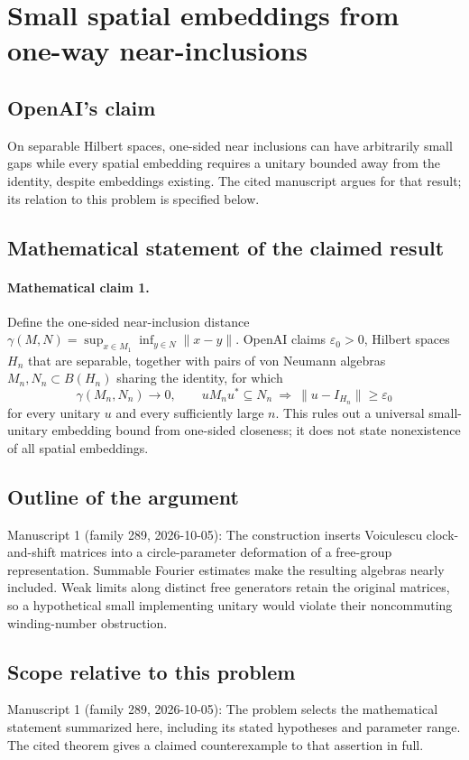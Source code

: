 \documentclass[11pt]{article}
\begin{document}
\section*{Small spatial embeddings from one-way near-inclusions}

\subsection{OpenAI's claim}
On separable Hilbert spaces, one-sided near inclusions can have arbitrarily small gaps while every spatial embedding requires a unitary bounded away from the identity, despite embeddings existing. The cited manuscript argues for that result; its relation to this problem is specified below.

\subsection{Mathematical statement of the claimed result}
\paragraph{Mathematical claim 1.} Define the one-sided near-inclusion distance $\gamma(M,N)=\sup_{x\in M_1}\inf_{y\in N}\|x-y\|$. OpenAI claims $\varepsilon_0>0$, Hilbert spaces $H_n$ that are separable, together with pairs of von Neumann algebras $M_n,N_n\subset B(H_n)$ sharing the identity, for which
\[
\gamma(M_n,N_n)\to0,
\qquad uM_nu^*\subseteq N_n\ \Longrightarrow\ \|u-I_{H_n}\|\ge\varepsilon_0
\]
for every unitary $u$ and every sufficiently large $n$. This rules out a universal small-unitary embedding bound from one-sided closeness; it does not state nonexistence of all spatial embeddings.

\subsection{Outline of the argument}
Manuscript 1 (family 289, 2026-10-05): The construction inserts Voiculescu clock-and-shift matrices into a circle-parameter deformation of a free-group representation. Summable Fourier estimates make the resulting algebras nearly included. Weak limits along distinct free generators retain the original matrices, so a hypothetical small implementing unitary would violate their noncommuting winding-number obstruction.

\subsection{Scope relative to this problem}
Manuscript 1 (family 289, 2026-10-05): The problem selects the mathematical statement summarized here, including its stated hypotheses and parameter range. The cited theorem gives a claimed counterexample to that assertion in full.
\end{document}
